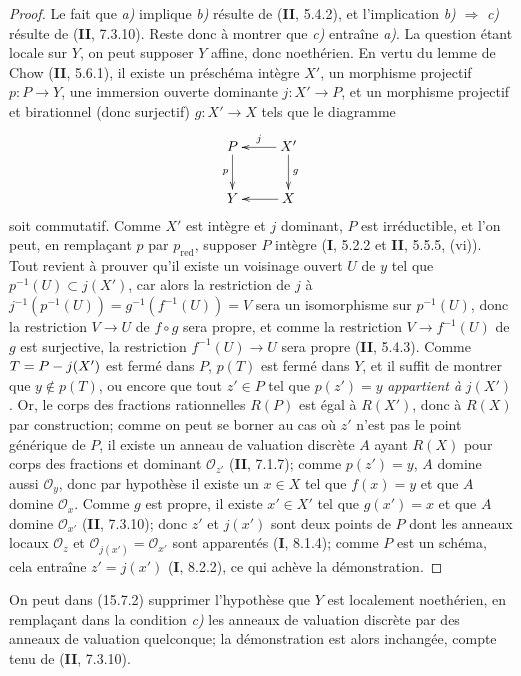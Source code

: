 \begin{proof}
Le fait que \emph{a)} implique \emph{b)} résulte de (\textbf{II}, 5.4.2), et l'implication \emph{b)} $\Rightarrow$ \emph{c)} résulte de (\textbf{II}, 7.3.10). Reste donc à montrer que \emph{c)} entraîne \emph{a)}. La question étant locale sur $Y$, on peut supposer $Y$ affine, donc noethérien. En vertu du lemme de Chow (\textbf{II}, 5.6.1), il existe un préschéma intègre $X'$, un morphisme projectif $p:P\to Y$, une immersion ouverte dominante $j:X'\to P$, et un morphisme projectif et birationnel (donc surjectif) $g:X'\to X$ tels que le diagramme
\[
\xymatrix{
P\ar[d]_-{p} & X'\ar[l]_-{j}\ar[d]^-{g}\\
Y & X\ar[l]
}
\]
soit commutatif. Comme $X'$ est intègre et $j$ dominant, $P$ est irréductible, et l'on peut, en remplaçant $p$ par $p_{\mathrm{red}}$, supposer $P$ intègre (\textbf{I}, 5.2.2 et \textbf{II}, 5.5.5, (vi)). Tout revient à prouver qu'il existe un voisinage ouvert $U$ de $y$ tel que $p^{-1}(U)\subset j(X')$, car alors la restriction de $j$ à
$j^{-1}(p^{-1}(U))=g^{-1}(f^{-1}(U))=V$
sera un isomorphisme sur $p^{-1}(U)$, donc la restriction $V\to U$ de $f\circ g$ sera propre, et comme la restriction $V\to f^{-1}(U)$ de $g$ est surjective, la restriction $f^{-1}(U)\to U$ sera propre (\textbf{II}, 5.4.3). Comme $T=P- j(X')$ est fermé dans $P$, $p(T)$ est fermé dans $Y$, et il suffit de montrer que $y\notin p(T)$, ou encore que tout $z'\in P$ tel que $p(z')=y$ \emph{appartient à} $j(X')$. Or, le corps des fractions rationnelles $R(P)$ est égal à $R(X')$, donc à $R(X)$ par construction; comme on peut se borner au cas où $z'$ n'est pas le point générique de $P$, il existe un anneau de valuation discrète $A$ ayant $R(X)$ pour corps des fractions et dominant $\mathcal O_{z'}$ (\textbf{II}, 7.1.7); comme $p(z')=y$, $A$ domine aussi $\mathcal O_y$, donc par hypothèse il existe un $x\in X$ tel que $f(x)=y$ et que $A$ domine $\mathcal O_x$. Comme $g$ est propre, il existe $x'\in X'$ tel que $g(x')=x$ et que $A$ domine $\mathcal O_{x'}$ (\textbf{II}, 7.3.10); donc $z'$ et $j(x')$ sont deux points de $P$ dont les anneaux locaux $\mathcal O_z$ et $\mathcal O_{j(x')}=\mathcal O_{x'}$ sont apparentés (\textbf{I}, 8.1.4); comme $P$ est un schéma, cela entraîne $z'=j(x')$ (\textbf{I}, 8.2.2), ce qui achève la démonstration.
\end{proof}

\begin{remark}[15.7.3]
\label{IV.15.7.3-fr}
On peut dans (15.7.2) supprimer l'hypothèse que $Y$ est localement noethérien, en remplaçant dans la condition \emph{c)} les anneaux de valuation discrète par des anneaux de valuation quelconque; la démonstration est alors inchangée, compte tenu de (\textbf{II}, 7.3.10).
\end{remark}

